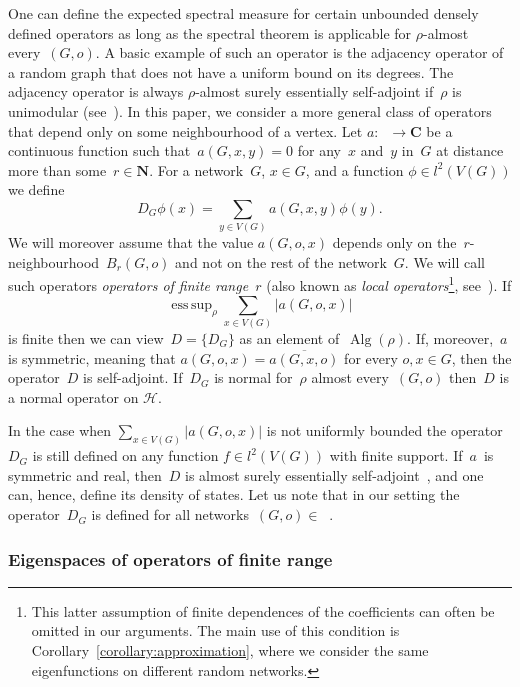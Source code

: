 \documentclass[english]{article}
\theoremstyle{definition}
\DeclareMathOperator{\Alg}{Alg} %
\DeclareMathOperator{\esssup}{ess\,sup} %
\DeclareMathOperator{\Gr}{{\mathcal{G}_*}}
\DeclareMathOperator{\Grr}{{\mathcal{G}_{**}}}
\newcommand*{\field}[1]{\mathbf{#1}} %
\newcommand*\N{\field{N}} %
\newcommand*\C{\field{C}} %
\begin{document}
One can define the expected spectral measure for certain unbounded densely defined operators as long as the spectral theorem is applicable for $\rho$-almost every~$(G, o)$. A basic example of such an operator is the adjacency operator of a random graph that does not have a uniform bound on its degrees. The adjacency operator is always $\rho$-almost surely essentially self-adjoint if~$\rho$ is unimodular (see~\cite{bordenave2017spectrum}). In this paper, we consider a more general class of operators that depend only on some neighbourhood of a vertex. Let $a\colon \Grr \to \C$ be a continuous function such that~$a (G, x, y) = 0$ for any~$x$ and~$y$ in~$G$ at distance more than some~$r \in \N$. For a network~$G$, $x \in G$, and a function $\phi \in l^2(V(G))$ we define 
$$
D_G \phi (x) = \sum_{y \in V(G)} a(G,x,y) \phi(y).
$$
We will moreover assume that the value $a(G,o,x)$ depends only on the~$r$-neighbourhood~$B_r(G,o)$ and not on the rest of the network~$G$. We will call such operators \emph{operators of finite range~$r$} (also known as \emph{local operators}\footnote{This latter assumption of finite dependences of the coefficients can often be omitted in our arguments. The main use of this condition is Corollary~\ref{corollary:approximation}, where we consider the same eigenfunctions on different random networks.}, see~\cite{bordenave2025}). If 
$$
\esssup_\rho \sum_{x \in V(G)}|a(G,o,x)|
$$
is finite then we can view~$D = \{D_G\}$ as an element of~$\Alg(\rho)$. If, moreover,~$a$ is symmetric, meaning that $a(G,o,x) = \overline{a(G,x,o)}$ for every $o,x \in G$, then the operator~$D$ is self-adjoint. If~$D_G$ is normal for~$\rho$ almost every~$(G,o)$ then~$D$ is a normal operator on $\mathcal{H}$. 

In the case when $\sum_{x \in V(G)}|a(G,o,x)|$ is not uniformly bounded the operator~$D_G$ is still defined on any function $f \in l^2(V(G))$ with finite support. If~$a$~is symmetric and real, then~$D$ is almost surely essentially self-adjoint~\cite{bordenave2017spectrum}, and one can, hence, define its density of states. 
Let us note that in our setting the operator~$D_G$  is defined for all networks~$(G,o) \in \Gr$. 


\subsubsection{Eigenspaces of operators of finite range}
\end{document}
